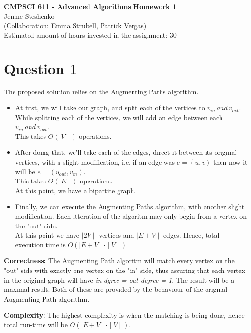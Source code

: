 \documentclass{article}
\begin{document}
\begin{center} \LARGE\textbf{CMPSCI 611 - Advanced Algorithms}
\Large\textbf{Homework 1}
\vspace{0.5cm}\\Jennie Steshenko\\
\small{(Collaboration: Emma Strubell, Patrick Vergas)}\\
Estimated amount of hours invested in the assignment: 30
\end{center}

\section*{Question 1}
The proposed solution relies on the Augmenting Paths algorithm.
\begin{itemize}
  \item At first, we will take our graph, and split each of the vertices to $v_{in} \, and \, v_{out}$. While splitting each of the vertices, we will add an edge between each $v_{in} \, and \, v_{out}$.\\ This takes $O(\mid V \mid)$ operations.
  \item After doing that, we'll take each of the edges, direct it between its original vertices, with a slight modification, i.e. if an edge was $e=(u,v)$ then now it will be $e=(u_{out}, v_{in})$.\\ 
  This takes $O(\mid E \mid)$ operations.\\
  At this point, we have a bipartite graph.
  \item Finally, we can execute the Augmenting Paths algorithm, with another slight modification. Each itteration of the algoritm may only begin from a vertex on the "out" side.\\
  At this point we have $\mid 2V \mid$ vertices and $\mid E + V \mid$ edges. Hence, total execution time is $O(\mid E + V \mid \cdot \mid V \mid)$
\end{itemize}

\textbf{Correctness:} The Augmenting Path algoritm will match every vertex on the "out" side with exactly one vertex on the "in" side, thus assuring that each vertex in the original graph will have \textit{in-dgree = out-degree = 1}. The result will be a maximal result. Both of these are provided by the behaviour of the original Augmenting Path algorithm.

\textbf{Complexity:} The highest complexity is when the matching is being done, hence total run-time will be $O(\mid E + V \mid \cdot \mid V \mid)$.
\end{document}
